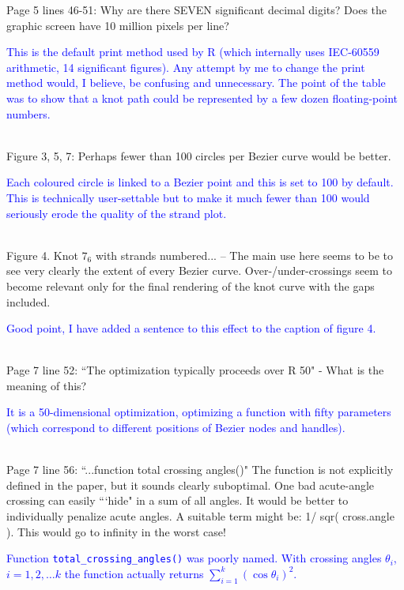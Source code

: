 \documentclass[12pt]{article}
\begin{document}
Page 5 lines 46-51: Why are there SEVEN significant decimal digits?
Does the graphic screen have 10 million pixels per line?

\textcolor{blue}{This is the default print method used by R (which
  internally uses IEC-60559 arithmetic, 14 significant figures).  Any
  attempt by me to change the print method would, I believe, be
  confusing and unnecessary.  The point of the table was to show that
  a knot path could be represented by a few dozen floating-point
  numbers.\\ \\}

Figure 3, 5, 7: Perhaps fewer than 100 circles per Bezier curve would
be better.

\textcolor{blue}{Each coloured circle is linked to a Bezier point and
  this is set to 100 by default.  This is technically user-settable
  but to make it much fewer than 100 would seriously erode the quality
  of the strand plot.\\ \\}

Figure 4.  Knot $7_6$ with strands numbered... -- The main use here seems
to be to see very clearly the extent of every Bezier curve.
Over-/under-crossings seem to become relevant only for the final
rendering of the knot curve with the gaps included.

\textcolor{blue}{Good point, I have added a sentence to this effect to
  the caption of figure 4.\\ \\}

Page 7 line 52: ``The optimization typically proceeds over R 50" - What
is the meaning of this?

\textcolor{blue}{It is a 50-dimensional optimization, optimizing a
  function with fifty parameters (which correspond to different
  positions of Bezier nodes and handles).\\ \\}

Page 7 line 56: ``...function total crossing angles()" The function is
not explicitly defined in the paper, but it sounds clearly suboptimal.
One bad acute-angle crossing can easily ```hide" in a sum of all angles.
It would be better to individually penalize acute angles.  A suitable
term might be: 1/ sqr( cross.angle ).  This would go to infinity in
the worst case!

\textcolor{blue}{Function {\tt total\_crossing\_angles()} was poorly
  named.  With crossing angles $\theta_i$, $i=1,2,\ldots k$ the
  function actually returns $\sum_{i=1}^k\left(\cos\theta_i\right)^2$.
  \\ \\}
\end{document}
